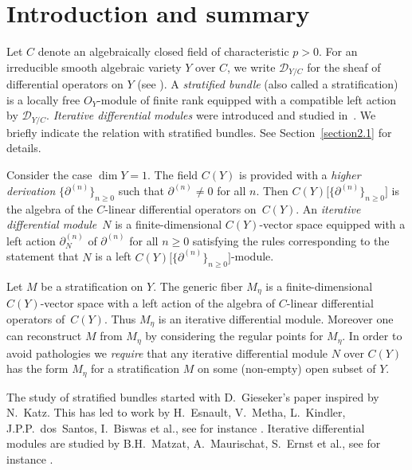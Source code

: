 \documentclass[pdftex]{sigma}
\numberwithin{equation}{section}
\begin{document}
\renewcommand{\thefootnote}{\arabic{footnote}}
\setcounter{footnote}{0}

\section{Introduction and summary}\label{section1}

Let $C$ denote an algebraically closed field of characteristic $p>0$. For an irreducible smooth algebraic variety $Y$ over $C$, we write $\mathcal{D}_{Y/C}$ for the sheaf of differential operators on $Y$ (see \cite[Section~16.8.1]{EGA4}). A {\it stratified bundle} (also called a stratification) is a locally free $O_Y$-module of finite rank equipped with a compatible left action by $\mathcal{D}_{Y/C}$. {\it Iterative differential modules} were introduced and studied in~\cite{Ma-vdP1}. We briefly indicate the relation with stratified bundles. See Section~\ref{section2.1} for details.

Consider the case $\dim Y=1$. The field $C(Y)$ is provided with a {\it higher derivation} $\big\{\partial^{(n)}\big\}_{n\geq 0}$ such that $\partial^{(n)}\neq 0$ for all $n$. Then $C(Y)\big[\big\{\partial^{(n)}\big\}_{n\geq 0}\big]$ is the algebra of the $C$-linear differential operators on~$C(Y)$. An {\it iterative differential module}~$N$ is a finite-dimensional $C(Y)$-vector space equipped with a left action $\partial_N^{(n)}$ of $\partial^{(n)}$ for all $n\geq 0$ satisfying the rules corresponding to the statement that $N$ is a left $C(Y)\big[\big\{\partial^{(n)}\big\}_{n\geq 0}\big]$-module.

 Let $M$ be a stratification on $Y$. The generic fiber $M_\eta$ is a finite-dimensional $C(Y)$-vector space with a left action of the algebra of $C$-linear differential operators of~$C(Y)$. Thus $M_\eta$ is an iterative differential module. Moreover one can reconstruct $M$ from $M_\eta$ by considering the regular points for $M_\eta$. In order to avoid pathologies we {\it require} that any iterative differential module $N$ over $C(Y)$ has the form $M_\eta$ for a stratification $M$ on some (non-empty) open subset of $Y$.

The study of stratified bundles started with D.~Gieseker's paper \cite{Gie} inspired by N.~Katz. This has led to work by H.~Esnault, V.~Metha, L.~Kindler, J.P.P.~dos~Santos, I.~Biswas et al., see for instance \cite{Sa, Es,Es-M,K,Ki}. Iterative differential modules are studied by B.H.~Matzat, A.~Maurischat, S.~Ernst et al., see for instance \cite{Er, Ma-vdP2,R}.
\end{document}
